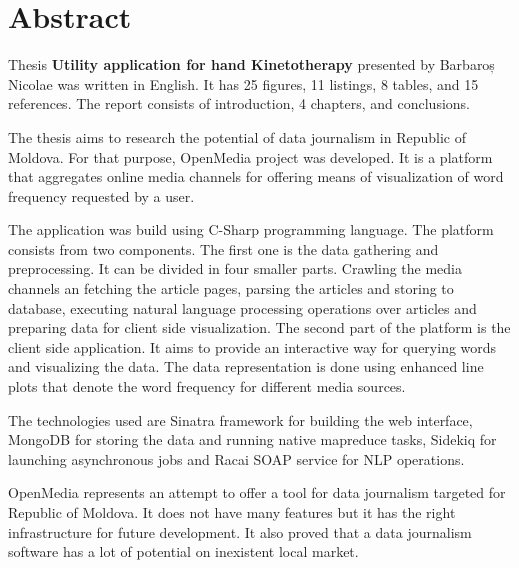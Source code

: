 \section*{Abstract}

Thesis \textbf{Utility application for hand Kinetotherapy} presented by Barbaroș Nicolae was written in English. It has 25 figures, 11 listings, 8 tables, and 15 references. The report consists of introduction, 4 chapters, and conclusions.

The thesis aims to research the potential of data journalism in Republic of Moldova. For that purpose, OpenMedia project was developed. It is a platform that aggregates online media channels for offering means of visualization of word frequency requested by a user.

The application was build using C-Sharp programming language. The platform consists from two components. The first one is the data gathering and preprocessing. It can be divided in four smaller parts. Crawling the media channels an fetching the article pages, parsing the articles and storing to database, executing natural language processing operations over articles and preparing data for client side visualization. The second part of the platform is the client side application. It aims to provide an interactive way for querying words and visualizing the data. The data representation is done using enhanced line plots that denote the word frequency for different media sources.

The technologies used are Sinatra framework for building the web interface, MongoDB for storing the data and running native mapreduce tasks, Sidekiq for launching asynchronous jobs and Racai SOAP service for NLP operations.

OpenMedia represents an attempt to offer a tool for data journalism targeted for Republic of Moldova. It does not have many features but it has the right infrastructure for future development. It also proved that a data journalism software has a lot of potential on inexistent local market.